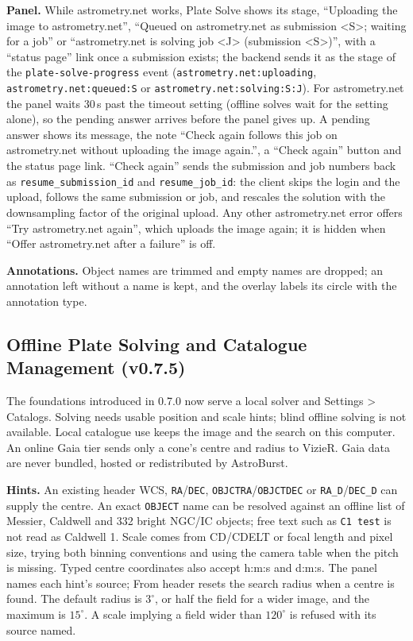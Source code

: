 \documentclass[11pt,a4paper]{article}
\newcommand{\code}[1]{\texttt{\small #1}}
\begin{document}
    \textbf{Panel.} While astrometry.net works, Plate Solve shows its stage, ``Uploading the image to astrometry.net'', ``Queued on astrometry.net as submission \textless S\textgreater; waiting for a job'' or ``astrometry.net is solving job \textless J\textgreater{} (submission \textless S\textgreater)'', with a ``status page'' link once a submission exists; the backend sends it as the stage of the \code{plate-solve-progress} event (\code{astrometry.net:uploading}, \code{astrometry.net:queued:S} or \code{astrometry.net:solving:S:J}). For astrometry.net the panel waits 30\,s past the timeout setting (offline solves wait for the setting alone), so the pending answer arrives before the panel gives up. A pending answer shows its message, the note ``Check again follows this job on astrometry.net without uploading the image again.'', a ``Check again'' button and the status page link. ``Check again'' sends the submission and job numbers back as \code{resume\_submission\_id} and \code{resume\_job\_id}: the client skips the login and the upload, follows the same submission or job, and rescales the solution with the downsampling factor of the original upload. Any other astrometry.net error offers ``Try astrometry.net again'', which uploads the image again; it is hidden when ``Offer astrometry.net after a failure'' is off.

    \textbf{Annotations.} Object names are trimmed and empty names are dropped; an annotation left without a name is kept, and the overlay labels its circle with the annotation type.

    \subsection{Offline Plate Solving and Catalogue Management (v0.7.5)}
    \label{sec:offline_foundations}

    \begin{notebox}
        The foundations introduced in 0.7.0 now serve a local solver and Settings > Catalogs. Solving needs usable position and scale hints; blind offline solving is not available. Local catalogue use keeps the image and the search on this computer. An online Gaia tier sends only a cone's centre and radius to VizieR. Gaia data are never bundled, hosted or redistributed by AstroBurst.
    \end{notebox}

    \textbf{Hints.} An existing header WCS, \code{RA}/\code{DEC}, \code{OBJCTRA}/\code{OBJCTDEC} or \code{RA\_D}/\code{DEC\_D} can supply the centre. An exact \code{OBJECT} name can be resolved against an offline list of Messier, Caldwell and 332 bright NGC/IC objects; free text such as \code{C1 test} is not read as Caldwell 1. Scale comes from CD/CDELT or focal length and pixel size, trying both binning conventions and using the camera table when the pitch is missing. Typed centre coordinates also accept h:m:s and d:m:s. The panel names each hint's source; From header resets the search radius when a centre is found. The default radius is $3^{\circ}$, or half the field for a wider image, and the maximum is $15^{\circ}$. A scale implying a field wider than $120^{\circ}$ is refused with its source named.
\end{document}

